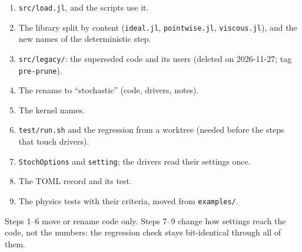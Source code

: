\documentclass[11pt,aps,preprint,nofootinbib,superscriptaddress,tightenlines]{revtex4-2}
\newcommand{\file}[1]{\texttt{#1}}
\begin{document}
\begin{enumerate}
\item \file{src/load.jl}, and the scripts use it.
\item The library split by content (\file{ideal.jl}, \file{pointwise.jl}, \file{viscous.jl}), and the new names of the deterministic step.
\item \file{src/legacy/}: the superseded code and its users (deleted on 2026-11-27; tag \file{pre-prune}).
\item The rename to ``stochastic'' (code, drivers, notes).
\item The kernel names.
\item \file{test/run.sh} and the regression from a worktree (needed before the steps that
  touch drivers).
\item \file{StochOptions} and \file{setting}; the drivers read their settings once.
\item The TOML record and its test.
\item The physics tests with their criteria, moved from \file{examples/}.
\end{enumerate}
Steps 1--6 move or rename code only.  Steps 7--9 change how settings reach the code, not the numbers:
the regression check stays bit-identical through all of them.
\end{document}
